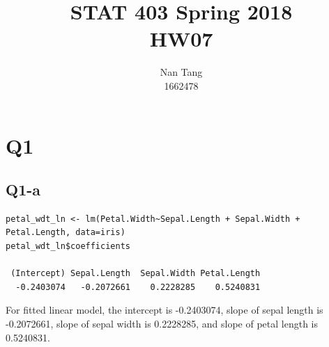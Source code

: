 \documentclass[12pt,letterpaper]{article}
\author{Nan Tang \\ 1662478}
\title{STAT 403 Spring 2018\\HW07}
\begin{document}
\maketitle

\section*{Q1}
\subsection*{Q1-a}
\begin{verbatim}
petal_wdt_ln <- lm(Petal.Width~Sepal.Length + Sepal.Width + Petal.Length, data=iris)
petal_wdt_ln$coefficients

 (Intercept) Sepal.Length  Sepal.Width Petal.Length 
  -0.2403074   -0.2072661    0.2228285    0.5240831 
\end{verbatim}

\noindent For fitted linear model, the intercept is -0.2403074, slope of sepal length is -0.2072661, slope of sepal width is  0.2228285, and slope of petal length is  0.5240831.
\end{document}
